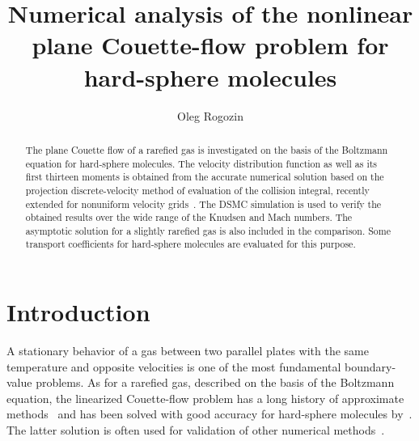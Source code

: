 \documentclass[]{jfm}
\begin{document}
\title{
    Numerical analysis of the nonlinear plane Couette-flow problem for hard-sphere molecules
}

\author{
    Oleg Rogozin
}

\maketitle

\begin{abstract}
    The plane Couette flow of a rarefied gas is investigated on the basis of
    the Boltzmann equation for hard-sphere molecules.
    The velocity distribution function as well as its first thirteen moments is obtained from
    the accurate numerical solution based on the projection discrete-velocity method
    of evaluation of the collision integral, recently extended for nonuniform velocity grids~\citep{Dodulad2015}.
    The DSMC simulation is used to verify the obtained results over the wide range of the Knudsen and Mach numbers.
    The asymptotic solution for a slightly rarefied gas is also included in the comparison.
    Some transport coefficients for hard-sphere molecules are evaluated for this purpose.
\end{abstract}


\section{Introduction}

A stationary behavior of a gas between two parallel plates with the same temperature
and opposite velocities is one of the most fundamental boundary-value problems.
As for a rarefied gas, described on the basis of the Boltzmann equation,
the linearized Couette-flow problem has a long history of approximate methods~\citep{Willis1962}
and has been solved with good accuracy for hard-sphere molecules by~\citet{Ohwada1990}.
The latter solution is often used for validation of other numerical methods~\citep[see e.g.][]{Fan2001,Aidun2010}.
\end{document}
